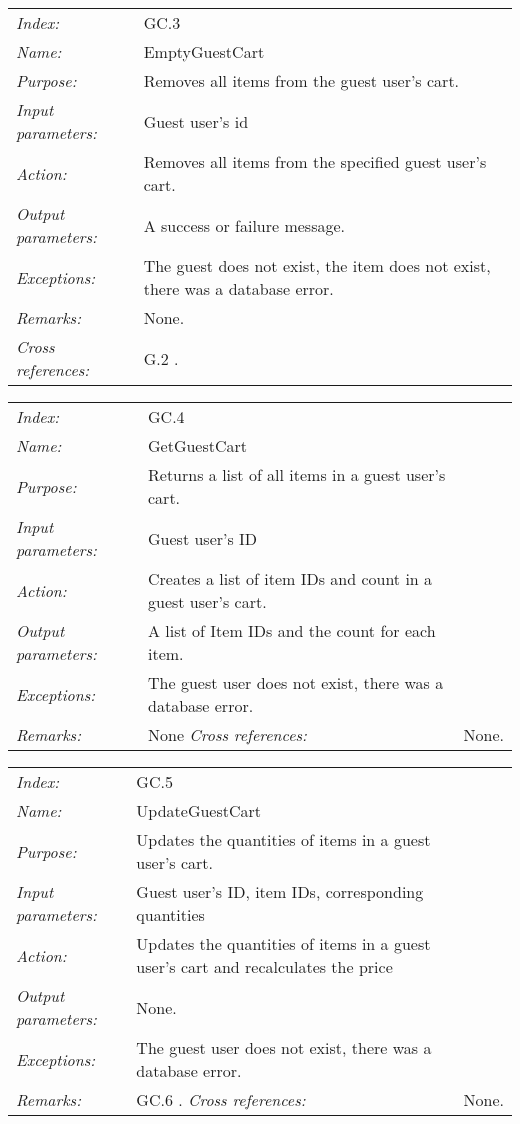 \documentclass[10pt,letter]{article}
\begin{document}
\begin{tabularx}{\textwidth}{l X}
    \it{Index:} & GC.3 \\
    \it{Name:} & EmptyGuestCart \\
    \it{Purpose:} & Removes all items from the guest user's cart. \\
    \it{Input parameters:} & Guest user's id \\
    \it{Action:} & Removes all items from the specified guest user's cart. \\
    \it{Output parameters:} & A success or failure message. \\
    \it{Exceptions:} & The guest does not exist, the item does not exist, there was a database error. \\
    \it{Remarks:} & None. \\
    \it{Cross references:} & G.2 . \\
    \hline
\end{tabularx}

\begin{tabularx}{\textwidth}{l X}
    \it{Index:} & GC.4 \\
    \it{Name:} & GetGuestCart \\
    \it{Purpose:} & Returns a list of all items in a guest user's cart. \\
    \it{Input parameters:} & Guest user's ID \\
    \it{Action:} & Creates a list of item IDs and count in a guest user's cart. \\
    \it{Output parameters:} & A list of Item IDs and the count for each item. \\
    \it{Exceptions:} & The guest user does not exist, there was a database error. \\
    \it{Remarks:} & None 
    \it{Cross references:} & None. \\
    \hline
\end{tabularx}

\begin{tabularx}{\textwidth}{l X}
    \it{Index:} & GC.5 \\
    \it{Name:} & UpdateGuestCart \\
    \it{Purpose:} & Updates the quantities of items in a guest user's cart. \\
    \it{Input parameters:} & Guest user's ID, item IDs, corresponding quantities\\
    \it{Action:} & Updates the quantities of items in a guest user's cart and recalculates the price \\
    \it{Output parameters:} & None. \\
    \it{Exceptions:} & The guest user does not exist, there was a database error. \\
    \it{Remarks:} & GC.6 .
    \it{Cross references:} & None. \\
    \hline
\end{tabularx}
\end{document}
